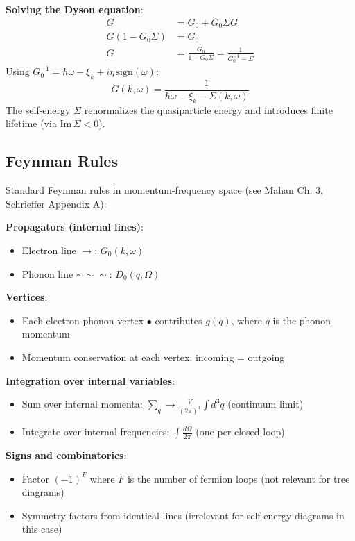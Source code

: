 \documentclass[12pt]{article}
\begin{document}
\textbf{Solving the Dyson equation}:
\begin{align}
G &= G_0 + G_0 \Sigma G \\
G(1 - G_0\Sigma) &= G_0 \\
G &= \frac{G_0}{1 - G_0\Sigma} = \frac{1}{G_0^{-1} - \Sigma}
\end{align}
Using $G_0^{-1} = \hbar\omega - \xi_k + i\eta\,\text{sign}(\omega)$:
\begin{equation}
\boxed{
G(k,\omega) = \frac{1}{\hbar\omega - \xi_k - \Sigma(k,\omega)}
}
\end{equation}
The self-energy $\Sigma$ renormalizes the quasiparticle energy and introduces finite lifetime (via $\text{Im}\,\Sigma < 0$).

\subsection{Feynman Rules}

Standard Feynman rules in momentum-frequency space (see Mahan Ch. 3, Schrieffer Appendix A):

\textbf{Propagators (internal lines)}:
\begin{itemize}
\item Electron line $\longrightarrow$: $G_0(k,\omega)$
\item Phonon line $\sim\sim\sim$: $D_0(q,\Omega)$
\end{itemize}

\textbf{Vertices}:
\begin{itemize}
\item Each electron-phonon vertex $\bullet$ contributes $g(q)$, where $q$ is the phonon momentum
\item Momentum conservation at each vertex: incoming = outgoing
\end{itemize}

\textbf{Integration over internal variables}:
\begin{itemize}
\item Sum over internal momenta: $\sum_q \to \frac{V}{(2\pi)^3}\int d^3q$ (continuum limit)
\item Integrate over internal frequencies: $\int \frac{d\Omega}{2\pi}$ (one per closed loop)
\end{itemize}

\textbf{Signs and combinatorics}:
\begin{itemize}
\item Factor $(-1)^F$ where $F$ is the number of fermion loops (not relevant for tree diagrams)
\item Symmetry factors from identical lines (irrelevant for self-energy diagrams in this case)
\end{itemize}
\end{document}
